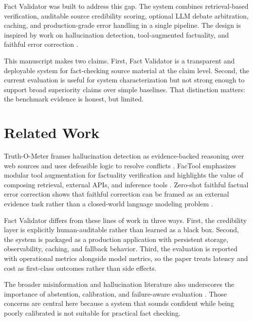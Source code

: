 \documentclass[11pt,a4paper]{article}
\begin{document}
Fact Validator was built to address this gap. The system combines retrieval-based verification, auditable source credibility scoring, optional LLM debate arbitration, caching, and production-grade error handling in a single pipeline. The design is inspired by work on hallucination detection, tool-augmented factuality, and faithful error correction \citep{galitsky2023truthometer,grave2020factool,kubota2023zero,thorne2018fever,ji2023hallucination,wen2024abstention}.

This manuscript makes two claims. First, Fact Validator is a transparent and deployable system for fact-checking source material at the claim level. Second, the current evaluation is useful for system characterization but not strong enough to support broad superiority claims over simple baselines. That distinction matters: the benchmark evidence is honest, but limited.

\section{Related Work}

Truth-O-Meter frames hallucination detection as evidence-backed reasoning over web sources and uses defeasible logic to resolve conflicts \citep{galitsky2023truthometer}. FacTool emphasizes modular tool augmentation for factuality verification and highlights the value of composing retrieval, external APIs, and inference tools \citep{grave2020factool}. Zero-shot faithful factual error correction shows that faithful correction can be framed as an external evidence task rather than a closed-world language modeling problem \citep{kubota2023zero}.

Fact Validator differs from these lines of work in three ways. First, the credibility layer is explicitly human-auditable rather than learned as a black box. Second, the system is packaged as a production application with persistent storage, observability, caching, and fallback behavior. Third, the evaluation is reported with operational metrics alongside model metrics, so the paper treats latency and cost as first-class outcomes rather than side effects.

The broader misinformation and hallucination literature also underscores the importance of abstention, calibration, and failure-aware evaluation \citep{ji2023hallucination,wen2024abstention}. Those concerns are central here because a system that sounds confident while being poorly calibrated is not suitable for practical fact checking.
\end{document}

